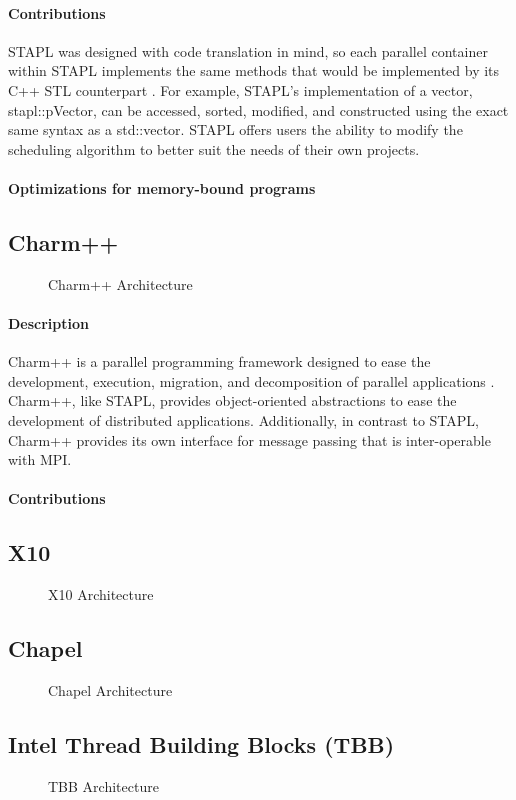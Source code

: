 \paragraph{Contributions} 

STAPL was designed with code translation in mind, so each parallel container within STAPL implements the same methods that would be implemented by its C++ STL counterpart \cite{stapl_parallel_container}. For example, STAPL's implementation of a vector, stapl::pVector, can be accessed, sorted, modified, and constructed using the exact same syntax as a std::vector. STAPL offers users the ability to modify the scheduling algorithm to better suit the needs of their own projects.


\paragraph{Optimizations for memory-bound programs} 

\subsection{Charm++}
\begin{figure}[h]
    \caption{Charm++ Architecture}
    \label{fig:charm_structure}
\end{figure}
\paragraph{Description}
Charm++ is a parallel programming framework designed to ease the development, execution, migration, and decomposition of parallel applications \cite{parallel_programming_w_charm}. Charm++, like STAPL, provides object-oriented abstractions to ease the development of distributed applications. Additionally, in contrast to STAPL, Charm++ provides its own interface for message passing that is inter-operable with MPI. 

\paragraph{Contributions}



\subsection{X10}
    \begin{figure}[h]
        \caption{X10 Architecture}
        \label{fig:x10_arch}
    \end{figure}

\subsection{Chapel}
    \begin{figure}[h]
        \caption{Chapel Architecture}
        \label{fig:chapel_arch}
    \end{figure}

\subsection{Intel Thread Building Blocks (TBB)} 
    \begin{figure}[h]
        \caption{TBB Architecture}
        \label{fig:tbb_arch}
    \end{figure}

